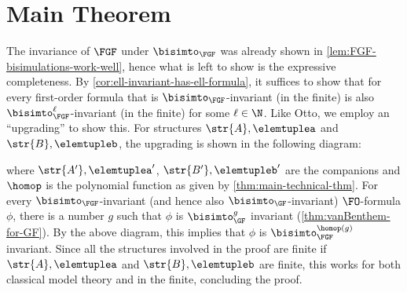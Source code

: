 \ifmainpart
\vanbenthemFGF
\else
  \section{Main Theorem}
  \vanbenthemFGF*
\fi
\ifmainpart
\newsavebox{\diagupgrading}
\begin{lrbox}{\diagupgrading}{
}
\end{lrbox}
\begin{proofsketch}
  The invariance of $\FGF$ under $\bisimto_{\FGF}$ was already shown in \cref{lem:FGF-bisimulations-work-well}, hence what is left to show is the expressive completeness.
  By \cref{cor:ell-invariant-has-ell-formula}, it suffices to show that for every first-order formula that is $\bisimto_{\FGF}$-invariant (in the finite) is also $\bisimto_{\FGF}^{\ell}$-invariant (in the finite) for some $\ell \in \N$.
  Like Otto, we employ an ``upgrading'' to show this.
  For structures $\str{A}, \elemtuplea$ and $\str{B}, \elemtupleb$, the upgrading is shown in the following diagram:
  \begin{center}%
    \usebox{\diagupgrading}
  \end{center}
  where $\str{A'}, \elemtuplea'$, $\str{B'}, \elemtupleb'$ are the companions and $\homop$ is the polynomial function as given by \cref{thm:main-technical-thm}.
  For every $\bisimto_{\FGF}$-invariant (and hence also $\bisimto_{\GF}$-invariant) $\FO$-formula $\phi$, there is a number $g$ such that $\phi$ is $\bisimto_{\GF}^{g}$ invariant (\cref{thm:vanBenthem-for-GF}).
  By the above diagram, this implies that $\phi$ is $\bisimto_{\FGF}^{\homop(g)}$ invariant.
  Since all the structures involved in the proof are finite if $\str{A}, \elemtuplea$ and $\str{B},  \elemtupleb$ are finite, this works for both classical model theory and in the finite, concluding the proof.
\end{proofsketch}

